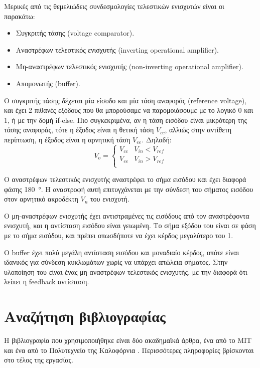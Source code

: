\documentclass[12pt]{article}
\begin{document}
Μερικές από τις θεμελιώδεις συνδεσμολογίες τελεστικών ενισχυτών είναι οι
παρακάτω:
\begin{itemize}
	\item Συγκριτής τάσης (voltage comparator).
	\item Αναστρέφων τελεστικός ενισχυτής (inverting operational
		amplifier).
	\item Μη-αναστρέφων τελεστικός ενισχυτής (non-inverting operational
		amplifier).
	\item Απομονωτής (buffer).
\end{itemize}

Ο συγκριτής τάσης δέχεται μία είσοδο και μία τάση αναφοράς (reference voltage),
και έχει 2 πιθανές εξόδους που θα μπορούσαμε να παρομοιάσουμε με το λογικό 0
και 1, ή με την δομή if-else. Πιο συγκεκριμένα, αν η τάση εισόδου είναι
μικρότερη της τάσης αναφοράς, τότε η έξοδος είναι η θετική τάση $V_{cc}$,
αλλιώς στην αντίθετη περίπτωση, η έξοδος είναι η αρνητική τάση $V_{ee}$.
Δηλαδή:
\[
	V_o = 
	\left\{
		\begin{array}{ll}
		V_{cc} & V_{in} < V_{ref} \\
		V_{ee} & V_{in} > V_{ref} \\
	\end{array}
	\right.
\]

Ο αναστρέφων τελεστικός ενισχυτής αναστρέφει το σήμα εισόδου και έχει διαφορά
φάσης \SI{180}{\degree}. Η αναστροφή αυτή επιτυγχάνεται με την σύνδεση του
σήματος εισόδου στον αρνητικό ακροδέκτη $V_n$ του ενισχυτή.

Ο μη-αναστρέφων ενισχυτής έχει αντιστραμένες τις εισόδους από τον αναστρέφοντα
ενισχυτή, και η αντίσταση εισόδου είναι γειωμένη. Το σήμα εξόδου του είναι σε
φάση με το σήμα εισόδου, και πρέπει οπωσδήποτε να έχει κέρδος μεγαλύτερο του 1.

Ο buffer έχει πολύ μεγάλη αντίσταση εισόδου και μοναδιαίο κέρδος, οπότε είναι
ιδανικός για σύνδεση κυκλωμάτων χωρίς να υπάρχει απώλεια σήματος. Στην υλοποίηση
του είναι ένας μη-αναστρέφων τελεστικός ενισχυτής, με την διαφορά ότι λείπει η
feedback αντίσταση.

\section{Αναζήτηση βιβλιογραφίας}

Η βιβλιογραφία που χρησιμοποιήθηκε είναι δύο ακαδημαϊκά άρθρα, ένα από το MIT
\cite{mit} και ένα από το Πολυτεχνείο της Καλοφόρνια \cite{cpp}. Περισσότερες
πληροφορίες βρίσκονται στο τέλος της εργασίας.
\end{document}
